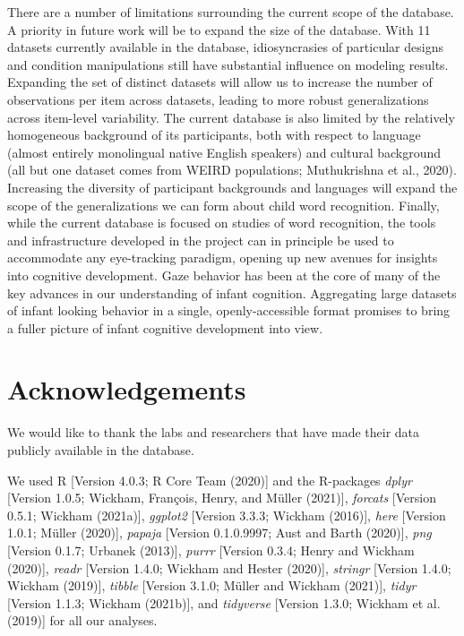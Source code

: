 \documentclass[
  english,
  man]{apa6}
\begin{document}
There are a number of limitations surrounding the current scope of the database. A priority in future work will be to expand the size of the database. With 11 datasets currently available in the database, idiosyncrasies of particular designs and condition manipulations still have substantial influence on modeling results. Expanding the set of distinct datasets will allow us to increase the number of observations per item across datasets, leading to more robust generalizations across item-level variability. The current database is also limited by the relatively homogeneous background of its participants, both with respect to language (almost entirely monolingual native English speakers) and cultural background (all but one dataset comes from WEIRD populations; Muthukrishna et al., 2020). Increasing the diversity of participant backgrounds and languages will expand the scope of the generalizations we can form about child word recognition.
Finally, while the current database is focused on studies of word recognition, the tools and infrastructure developed in the project can in principle be used to accommodate any eye-tracking paradigm, opening up new avenues for insights into cognitive development. Gaze behavior has been at the core of many of the key advances in our understanding of infant cognition. Aggregating large datasets of infant looking behavior in a single, openly-accessible format promises to bring a fuller picture of infant cognitive development into view.

\hypertarget{acknowledgements}{%
\section{Acknowledgements}\label{acknowledgements}}

We would like to thank the labs and researchers that have made their data publicly available in the database.

We used R {[}Version 4.0.3; R Core Team (2020){]} and the R-packages \emph{dplyr} {[}Version 1.0.5; Wickham, François, Henry, and Müller (2021){]}, \emph{forcats} {[}Version 0.5.1; Wickham (2021a){]}, \emph{ggplot2} {[}Version 3.3.3; Wickham (2016){]}, \emph{here} {[}Version 1.0.1; Müller (2020){]}, \emph{papaja} {[}Version 0.1.0.9997; Aust and Barth (2020){]}, \emph{png} {[}Version 0.1.7; Urbanek (2013){]}, \emph{purrr} {[}Version 0.3.4; Henry and Wickham (2020){]}, \emph{readr} {[}Version 1.4.0; Wickham and Hester (2020){]}, \emph{stringr} {[}Version 1.4.0; Wickham (2019){]}, \emph{tibble} {[}Version 3.1.0; Müller and Wickham (2021){]}, \emph{tidyr} {[}Version 1.1.3; Wickham (2021b){]}, and \emph{tidyverse} {[}Version 1.3.0; Wickham et al. (2019){]} for all our analyses.
\end{document}

